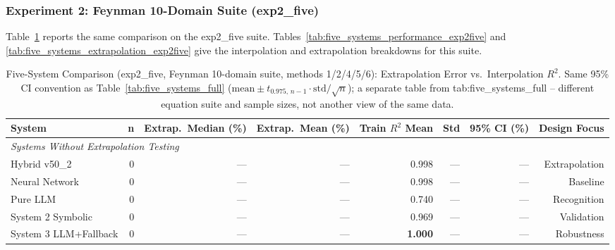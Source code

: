 \documentclass[twoside,11pt]{article}
\begin{document}
\subsubsection{Experiment 2: Feynman 10-Domain Suite (exp2\_five)}\label{subsubsec:five-system-exp2}

Table~\ref{tab:five_systems_full_exp2five} reports the same
comparison on the exp2\_five suite. Tables~\ref{tab:five_systems_performance_exp2five}
and \ref{tab:five_systems_extrapolation_exp2five} give the interpolation and
extrapolation breakdowns for this suite.

\begin{table}[t]
\centering
\caption{Five-System Comparison (exp2\_five, Feynman 10-domain suite,
  methods 1/2/4/5/6): Extrapolation Error vs.\ Interpolation $R^2$.
  Same 95\% CI convention as Table~\ref{tab:five_systems_full}
  ($\mathrm{mean} \pm t_{0.975,\,n-1} \cdot \mathrm{std}/\sqrt{n}$); a
  separate table from tab:five\_systems\_full -- different equation suite
  and sample sizes, not another view of the same data.}
\label{tab:five_systems_full_exp2five}
\begin{tabular}{lrrrrrrr}
\toprule
\textbf{System} & \textbf{n}
  & \textbf{Extrap.\ Median (\%)} & \textbf{Extrap.\ Mean (\%)}
  & \textbf{Train $R^2$ Mean} & \textbf{Std} & \textbf{95\% CI (\%)}
  & \textbf{Design Focus} \\
\midrule
\midrule
\multicolumn{8}{l}{\textit{Systems Without Extrapolation Testing}} \\
Hybrid v50\_2 & 0 & --- & --- & 0.998 & --- & --- & Extrapolation \\
Neural Network & 0 & --- & --- & 0.998 & --- & --- & Baseline \\
Pure LLM & 0 & --- & --- & 0.740 & --- & --- & Recognition \\
System 2 Symbolic & 0 & --- & --- & 0.969 & --- & --- & Validation \\
System 3 LLM+Fallback & 0 & --- & --- & \textbf{1.000} & --- & --- & Robustness \\
\bottomrule
\end{tabular}
\end{table}
\end{document}
